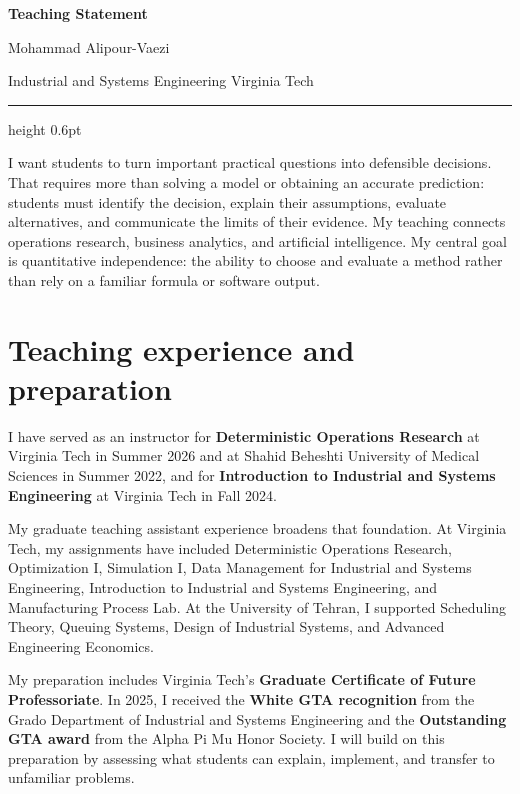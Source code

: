 \documentclass[11pt,letterpaper]{article}
\begin{document}
\color{Body}
\thispagestyle{firstpage}

{\LARGE\bfseries Teaching Statement}
\par
\vspace{3pt}

{\large Mohammad Alipour-Vaezi}
\par

{\small\color{Muted}
Industrial and Systems Engineering \textbar{} Virginia Tech}
\par
\vspace{5pt}

{\color{Accent}\hrule height 0.6pt}
\vspace{6pt}

I want students to turn important practical questions into defensible
decisions. That requires more than solving a model or obtaining an accurate
prediction: students must identify the decision, explain their assumptions,
evaluate alternatives, and communicate the limits of their evidence. My
teaching connects operations research, business analytics, and artificial
intelligence. My central goal is quantitative independence: the ability to
choose and evaluate a method rather than rely on a familiar formula or
software output.

\section{Teaching experience and preparation}

I have served as an instructor for \textbf{Deterministic Operations Research}
at Virginia Tech in Summer 2026 and at Shahid Beheshti University of Medical
Sciences in Summer 2022, and for \textbf{Introduction to Industrial and
Systems Engineering} at Virginia Tech in Fall 2024.

My graduate teaching assistant experience broadens that foundation. At
Virginia Tech, my assignments have included Deterministic Operations
Research, Optimization I, Simulation I, Data Management for Industrial and
Systems Engineering, Introduction to Industrial and Systems Engineering,
and Manufacturing Process Lab. At the University of Tehran, I supported
Scheduling Theory, Queuing Systems, Design of Industrial Systems, and
Advanced Engineering Economics.

My preparation includes Virginia Tech's \textbf{Graduate Certificate of
Future Professoriate}. In 2025, I received the \textbf{White GTA recognition}
from the Grado Department of Industrial and Systems Engineering and the
\textbf{Outstanding GTA award} from the Alpha Pi Mu Honor Society. I will
build on this preparation by assessing what students can explain,
implement, and transfer to unfamiliar problems.
\end{document}

